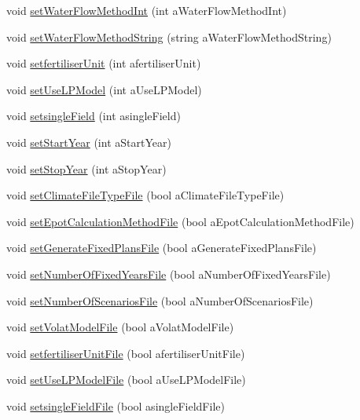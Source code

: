\begin{DoxyCompactItemize}
void \hyperlink{classsystem_run_data_aefe92f11ae01308c9a85056f47eb6153}{setWaterFlowMethodInt} (int aWaterFlowMethodInt)
\item 
void \hyperlink{classsystem_run_data_acdcd8cbd189069d24e196122442dc628}{setWaterFlowMethodString} (string aWaterFlowMethodString)
\item 
void \hyperlink{classsystem_run_data_aebe119385870aec926764d6918cde81c}{setfertiliserUnit} (int afertiliserUnit)
\item 
void \hyperlink{classsystem_run_data_a97743167871b2e7d4a8ad89f5f15cef2}{setUseLPModel} (int aUseLPModel)
\item 
void \hyperlink{classsystem_run_data_a85126e0068d4d9835df4edb865032218}{setsingleField} (int asingleField)
\item 
void \hyperlink{classsystem_run_data_a20119fc42d77477376bb8807bfffea0f}{setStartYear} (int aStartYear)
\item 
void \hyperlink{classsystem_run_data_afb3c83dc494b80a101de20b02225541c}{setStopYear} (int aStopYear)
\item 
void \hyperlink{classsystem_run_data_aa433850561e78296dbb6db231c1d5318}{setClimateFileTypeFile} (bool aClimateFileTypeFile)
\item 
void \hyperlink{classsystem_run_data_af6065fc43b9ed294e278a38f50eaa9cd}{setEpotCalculationMethodFile} (bool aEpotCalculationMethodFile)
\item 
void \hyperlink{classsystem_run_data_a12733d14d75b6d359536b0be5cdac074}{setGenerateFixedPlansFile} (bool aGenerateFixedPlansFile)
\item 
void \hyperlink{classsystem_run_data_a7d0177163f26671a060f29d7422aae43}{setNumberOfFixedYearsFile} (bool aNumberOfFixedYearsFile)
\item 
void \hyperlink{classsystem_run_data_a4cafdae5fe793c31745b55d8b4df93b6}{setNumberOfScenariosFile} (bool aNumberOfScenariosFile)
\item 
void \hyperlink{classsystem_run_data_ade3ec857e52f5dc77f5389dedb28c32d}{setVolatModelFile} (bool aVolatModelFile)
\item 
void \hyperlink{classsystem_run_data_adfa8b92e71fd5d8dff2a8beb1e9a1a80}{setfertiliserUnitFile} (bool afertiliserUnitFile)
\item 
void \hyperlink{classsystem_run_data_a2c88cf333aed87dc98d1ba3d0b9339d8}{setUseLPModelFile} (bool aUseLPModelFile)
\item 
void \hyperlink{classsystem_run_data_aee963fbc3e4c6d592f19f49d22ed9cfd}{setsingleFieldFile} (bool asingleFieldFile)
\item 

\end{DoxyCompactItemize}
